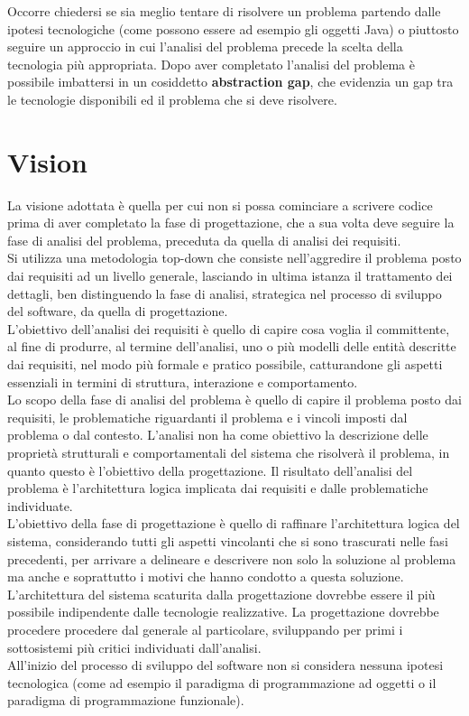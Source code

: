 \documentclass{llncs}
\newcommand{\labelsec}[1]{\label{sec:#1}}
\begin{document}
Occorre chiedersi se sia meglio tentare di risolvere un problema partendo dalle ipotesi tecnologiche (come possono essere ad esempio gli oggetti Java) o piuttosto seguire un approccio in cui l'analisi del problema precede la scelta della tecnologia più appropriata. 
Dopo aver completato l'analisi del problema è possibile imbattersi in un cosiddetto \textbf{abstraction gap}, che evidenzia un gap tra le tecnologie disponibili ed il problema che si deve risolvere. 

\section{Vision}
\labelsec{vision}

La visione adottata è quella per cui non si possa cominciare a scrivere codice prima di aver completato la fase di progettazione, che a sua volta deve seguire la fase di analisi del problema, preceduta da quella di analisi dei requisiti.  \\
Si utilizza una metodologia top-down che consiste nell'aggredire il problema posto dai requisiti ad un livello generale, lasciando in ultima istanza il trattamento dei dettagli, ben distinguendo la fase di analisi, strategica nel processo di sviluppo del software, da quella di progettazione. \\ \indent 
L'obiettivo dell'analisi dei requisiti è quello di capire cosa voglia il committente, al fine di produrre, al termine dell'analisi, uno o più modelli delle entità descritte dai requisiti, nel modo più formale e pratico possibile, catturandone gli aspetti essenziali in termini di struttura, interazione e comportamento. \\ \indent 
Lo scopo della fase di analisi del problema è quello di capire il problema posto dai requisiti, le problematiche riguardanti il problema e i vincoli imposti dal problema o dal contesto. L'analisi non ha come obiettivo la descrizione delle proprietà strutturali e comportamentali del sistema che risolverà il problema, in quanto questo è l'obiettivo della progettazione. Il risultato dell'analisi del problema è l'architettura logica implicata dai requisiti e dalle problematiche individuate. \\ \indent 
L'obiettivo della fase di progettazione è quello di raffinare l'architettura logica del sistema, considerando tutti gli aspetti vincolanti che si sono trascurati nelle fasi precedenti, per arrivare a delineare e descrivere non solo la soluzione al problema ma anche e soprattutto i motivi che hanno condotto a questa soluzione. 
L'architettura del sistema scaturita dalla progettazione dovrebbe essere il più possibile indipendente dalle tecnologie realizzative. La progettazione dovrebbe procedere procedere dal generale al particolare, sviluppando per primi i sottosistemi più critici individuati dall'analisi. \\ \indent 
All'inizio del processo di sviluppo del software non si considera nessuna ipotesi tecnologica (come ad esempio il paradigma di programmazione ad oggetti o il paradigma di programmazione funzionale).
\end{document}
